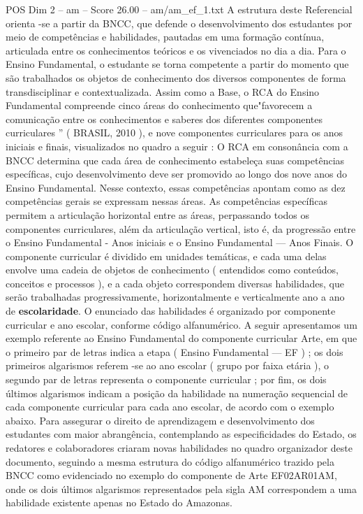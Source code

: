 \begin{textsample}{POS Dim 2 – am – Score 26.00 – am/am\_ef\_1.txt}
A estrutura deste Referencial orienta -se a partir da BNCC, que defende o desenvolvimento dos estudantes por meio de competências e habilidades, pautadas em uma formação contínua, articulada entre os conhecimentos teóricos e os vivenciados no dia a dia.
Para o Ensino Fundamental, o estudante se torna competente a partir do momento que são trabalhados os objetos de conhecimento dos diversos componentes de forma transdisciplinar e contextualizada.
Assim como a Base, o RCA do Ensino Fundamental compreende cinco áreas do conhecimento que"favorecem a comunicação entre os conhecimentos e saberes dos diferentes componentes curriculares ” ( BRASIL, 2010 ), e nove componentes curriculares para os anos iniciais e finais, visualizados no quadro a seguir : O RCA em consonância com a BNCC determina que cada área de conhecimento estabeleça suas competências específicas, cujo desenvolvimento deve ser promovido ao longo dos nove anos do Ensino Fundamental.
Nesse contexto, essas competências apontam como as dez competências gerais se expressam nessas áreas.
As competências específicas permitem a articulação horizontal entre as áreas, perpassando todos os componentes curriculares, além da articulação vertical, isto é, da progressão entre o Ensino Fundamental - Anos iniciais e o Ensino Fundamental — Anos Finais.
O componente curricular é dividido em unidades temáticas, e cada uma delas envolve uma cadeia de objetos de conhecimento ( entendidos como conteúdos, conceitos e processos ), e a cada objeto correspondem diversas habilidades, que serão trabalhadas progressivamente, horizontalmente e verticalmente ano a ano de \textbf{escolaridade}.
O enunciado das habilidades é organizado por componente curricular e ano escolar, conforme código alfanumérico.
A seguir apresentamos um exemplo referente ao Ensino Fundamental do componente curricular Arte, em que o primeiro par de letras indica a etapa ( Ensino Fundamental — EF ) ; os dois primeiros algarismos referem -se ao ano escolar ( grupo por faixa etária ), o segundo par de letras representa o componente curricular ; por fim, os dois últimos algarismos indicam a posição da habilidade na numeração sequencial de cada componente curricular para cada ano escolar, de acordo com o exemplo abaixo.
Para assegurar o direito de aprendizagem e desenvolvimento dos estudantes com maior abrangência, contemplando as especificidades do Estado, os redatores e colaboradores criaram novas habilidades no quadro organizador deste documento, seguindo a mesma estrutura do código alfanumérico trazido pela BNCC como evidenciado no exemplo do componente de Arte EF02AR01AM, onde os dois últimos algarismos representados pela sigla AM correspondem a uma habilidade existente apenas no Estado do Amazonas.

\end{textsample}
